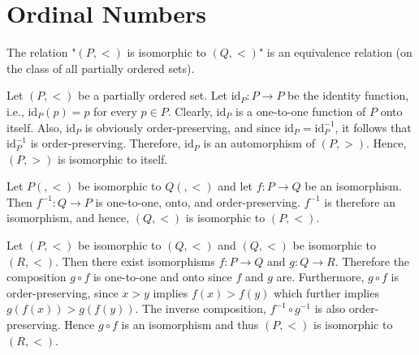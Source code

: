 \chapter{Ordinal Numbers}

 The relation "$(P, <)$ is isomorphic to $(Q, <)$" is an 
equivalence relation (on the class of all partially ordered sets).
\begin{solution}
Let $(P, <)$ be a partially ordered set. Let $\text{id}_P : P \rightarrow P$ 
be the identity function, i.e., $\text{id}_P(p) = p$ for every $p \in P$. 
Clearly, $\text{id}_P$ is a one-to-one function of $P$ onto itself. Also, 
$\text{id}_P$ is obviously order-preserving, and since 
$\text{id}_P = \text{id}^{-1}_P$, it follows that $\text{id}^{-1}_P$ is 
order-preserving. Therefore, $\text{id}_P$ is an automorphism of $(P, >)$. 
Hence, $(P, >)$ is isomorphic to itself.

Let $P(, <)$ be isomorphic to $Q(, <)$ and let $f : P \rightarrow Q$ be an 
isomorphism. Then $f^{-1} : Q \rightarrow P$ is one-to-one, onto, and 
order-preserving. $f^{-1}$ is therefore an isomorphism, and hence, $(Q, <)$ is 
isomorphic to $(P, <)$.

Let $(P, <)$ be isomorphic to $(Q, <)$ and $(Q, <)$ be isomorphic to $(R, <)$. 
Then there exist isomorphisms $f : P \rightarrow Q$ and $g : Q \rightarrow R$. 
Therefore the composition $g \circ f$ is one-to-one and onto since $f$ and $g$ 
are. Furthermore, $g \circ f$ is order-preserving, since $x > y$ implies 
$f(x) > f(y)$ which further implies $g(f(x)) > g(f(y))$. The inverse 
composition, $f^{-1} \circ g^{-1}$ is also order-preserving. Hence $g \circ f$ 
is an isomorphism and thus $(P, <)$ is isomorphic to $(R, <)$.
\end{solution}